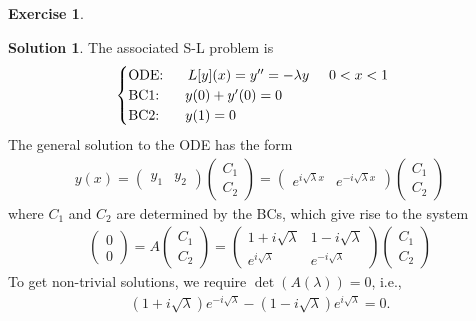 \documentclass{article}
\theoremstyle{definition}
\newtheorem*{exer*}{Exercise}
\newtheorem*{sln*}{Solution}
\newcommand{\C}{\mathbb{C}}
\begin{document}
\begin{exer*}
\begin{enumerate}
\begin{sln*}
			The associated S-L problem is
			\begin{align*}
			\begin{cases}
			\text{ODE: }\hspace{0.5cm} L[y](x) = y'' = -\lambda y\hspace{0.5cm} 0<x<1\\
			\text{BC1: }\hspace{0.5cm} y(0) + y'(0) = 0\\
			\text{BC2: }\hspace{0.5cm} y(1) = 0
			\end{cases}
			\end{align*}
			The general solution to the ODE has the form
			\begin{align*}
			y(x) = \begin{pmatrix}
			y_1 & y_2
			\end{pmatrix}\begin{pmatrix}
			C_1\\C_2
			\end{pmatrix}= 
			\begin{pmatrix}
			e^{i\sqrt{\lambda}x}&e^{-i\sqrt{\lambda} x}
			\end{pmatrix}
			\begin{pmatrix}
			C_1\\C_2
			\end{pmatrix}
			\end{align*}
			where $C_1$ and $C_2$ are determined by the BCs, which give rise to the system 
			\begin{align*}
			\begin{pmatrix}
			0\\0
			\end{pmatrix} = A\begin{pmatrix}
			C_1\\C_2
			\end{pmatrix} = \begin{pmatrix}
			1 + i\sqrt{\lambda} &  1 -i\sqrt{\lambda}  \\  e^{i\sqrt{\lambda}}  & e^{-i\sqrt{\lambda}} 
			\end{pmatrix}
			\begin{pmatrix}
			C_1\\C_2
			\end{pmatrix}
			\end{align*}	
			To get non-trivial solutions, we require $\det(A(\lambda)) = 0$, i.e., 
			\begin{align*}
			(1+i\sqrt{\lambda})e^{-i\sqrt{\lambda}} - (1-i\sqrt{\lambda})e^{i\sqrt{\lambda}} = 0. 

\end{align*}
\end{sln*}
\end{enumerate}
\end{exer*}
\end{document}
